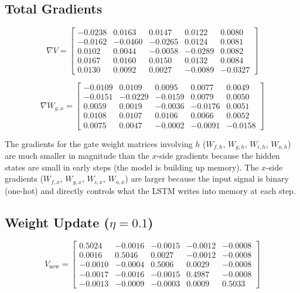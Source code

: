 \subsection{Total Gradients}

\begin{equation}
    \nabla V = \begin{bmatrix}
    -0.0238 &  0.0163 &  0.0147 &  0.0122 &  0.0080 \\
    -0.0162 & -0.0460 & -0.0265 &  0.0124 &  0.0081 \\
     0.0102 &  0.0044 & -0.0058 & -0.0289 &  0.0082 \\
     0.0167 &  0.0160 &  0.0150 &  0.0132 &  0.0084 \\
     0.0130 &  0.0092 &  0.0027 & -0.0089 & -0.0327
    \end{bmatrix}
\end{equation}

\begin{equation}
    \nabla W_{g,x} = \begin{bmatrix}
    -0.0109 &  0.0109 &  0.0095 &  0.0077 &  0.0049 \\
    -0.0151 & -0.0229 & -0.0159 &  0.0079 &  0.0050 \\
     0.0059 &  0.0019 & -0.0036 & -0.0176 &  0.0051 \\
     0.0108 &  0.0107 &  0.0106 &  0.0066 &  0.0052 \\
     0.0075 &  0.0047 & -0.0002 & -0.0091 & -0.0158
    \end{bmatrix}
\end{equation}

The gradients for the gate weight matrices involving $h$ ($W_{f,h}$, $W_{g,h}$,
$W_{i,h}$, $W_{o,h}$) are much smaller in magnitude than the $x$-side gradients
because the hidden states are small in early steps (the model is building up memory).
The $x$-side gradients ($W_{f,x}$, $W_{g,x}$, $W_{i,x}$, $W_{o,x}$) are larger
because the input signal is binary (one-hot) and directly controls what the LSTM writes
into memory at each step.

\subsection{Weight Update ($\eta = 0.1$)}

\begin{equation}
    V_{\text{new}} = \begin{bmatrix}
     0.5024 & -0.0016 & -0.0015 & -0.0012 & -0.0008 \\
     0.0016 &  0.5046 &  0.0027 & -0.0012 & -0.0008 \\
    -0.0010 & -0.0004 &  0.5006 &  0.0029 & -0.0008 \\
    -0.0017 & -0.0016 & -0.0015 &  0.4987 & -0.0008 \\
    -0.0013 & -0.0009 & -0.0003 &  0.0009 &  0.5033
    \end{bmatrix}
\end{equation}

